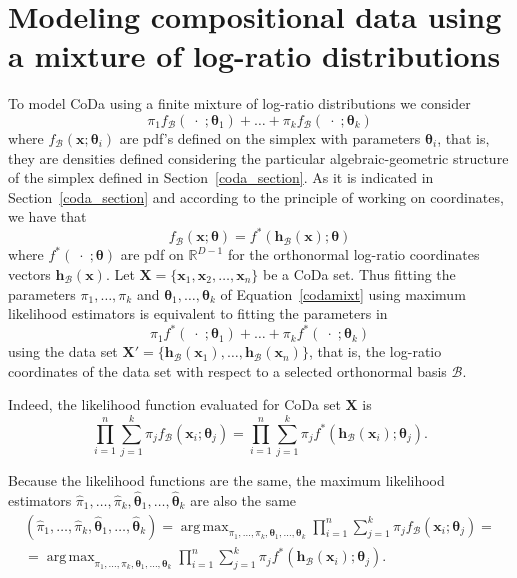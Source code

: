 \documentclass[12pt, a4paper]{article}
\newcommand{\m}[1]{\boldsymbol{#1}}
\DeclareMathOperator*{\argmax}{arg\,max}
\begin{document}
\section{Modeling compositional data using a mixture of log-ratio distributions}
\label{codamix_section}

\noindent To model CoDa using a finite mixture of log-ratio distributions we consider 
\begin{equation}
\pi_1 f_\mathcal{B}(\;\cdot\; ; \m\theta_1) + \dots + \pi_k f_\mathcal{B}(\;\cdot\; ; \m\theta_k)
\label{codamixt}
\end{equation}
where $f_\mathcal{B}(\textbf{x} ; \m\theta_i)$ are pdf's defined on the simplex with parameters $\m\theta_i$, that is, they are densities defined considering the particular algebraic-geometric structure of the simplex defined in Section~\ref{coda_section}. As it is indicated in Section~\ref{coda_section} and according to the principle of working on coordinates, we have that
\[f_\mathcal{B}(\textbf{x} ; \m\theta) = f^*(\textbf{h}_\mathcal{B}(\textbf{x}) ; \m\theta)\]
where $f^*(\;\cdot\; ; \m\theta)$ are pdf on $\mathbb{R}^{D-1}$ for the orthonormal log-ratio coordinates vectors $\textbf{h}_\mathcal{B}(\textbf{x})$. Let $\mathbf{X} =  \{ \textbf{x}_1, \textbf{x}_2, \dots , \textbf{x}_n \}$ be a CoDa set. 
Thus fitting the parameters $\pi_1, \dots, \pi_k$ and $\m\theta_1, \dots, \m\theta_k$ of Equation~\ref{codamixt} using maximum likelihood estimators is equivalent to fitting the parameters in
\begin{equation}
\pi_1 f^*(\;\cdot\; ; \m\theta_1) + \dots + \pi_k f^*(\;\cdot\; ; \m\theta_k)
\label{coordmixt}
\end{equation}
using the data set $\mathbf{X}' = \{ \textbf{h}_\mathcal{B}(\mathbf{x}_1), \dots, \textbf{h}_\mathcal{B}(\mathbf{x}_n) \}$, that is, the log-ratio coordinates of the data set with respect to a selected orthonormal basis $\mathcal{B}$.

Indeed, the likelihood function evaluated for CoDa set $\mathbf{X}$ is
\begin{equation}\label{likeli1}
\prod_{i=1}^n \sum_{j=1}^k \pi_j f_\mathcal{B}(\textbf{x}_i; \m\theta_j)=\prod_{i=1}^n \sum_{j=1}^k \pi_j f^*(\textbf{h}_\mathcal{B}(\textbf{x}_i); \m\theta_j).
\end{equation}

Because the likelihood functions are the same,  the maximum likelihood estimators $\hat{\pi}_1, \dots, \hat{\pi}_k, \hat{\m\theta}_1, \dots, \hat{\m\theta}_k$ are also the same
\begin{eqnarray}\label{likeli2}
\left( \hat{\pi}_1, \dots, \hat{\pi}_k, \hat{\m\theta}_1, \dots, \hat{\m\theta}_k\right) = \argmax_{\pi_1, \dots, \pi_k, \m\theta_1, \dots, \m\theta_k} \prod_{i=1}^n \sum_{j=1}^k \pi_j f_\mathcal{B}(\textbf{x}_i; \m\theta_j) = \\ 
= \argmax_{\pi_1, \dots, \pi_k, \m\theta_1, \dots, \m\theta_k} \prod_{i=1}^n \sum_{j=1}^k \pi_j f^*(\textbf{h}_\mathcal{B}(\textbf{x}_i); \m\theta_j).
\end{eqnarray}
\end{document}
